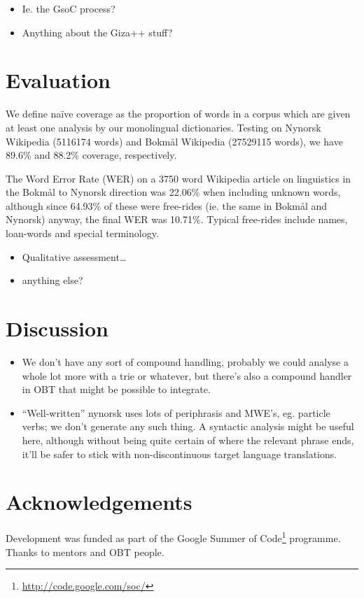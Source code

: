 \documentclass[11pt]{article}
\begin{document}
\begin{itemize}
\item Ie. the GsoC process?
\item Anything about the Giza++ stuff?
\end{itemize}
\section{Evaluation}
\label{sec-4}

We define naïve coverage as the proportion of words in a corpus which
are given at least one analysis by our monolingual
dictionaries. Testing on Nynorsk Wikipedia (5116174 words) and Bokmål
Wikipedia (27529115 words), we have 89.6\% and 88.2\% coverage,
respectively.

The Word Error Rate (WER) on a 3750 word Wikipedia article on
linguistics in the Bokmål to Nynorsk direction was 22.06\% when
including unknown words, although since 64.93\% of these were
free-rides (ie. the same in Bokmål and Nynorsk) anyway, the final WER
was 10.71\%. Typical free-rides include names, loan-words and special
terminology.

\begin{itemize}
\item Qualitative assessment\ldots{}
\item anything else?
\end{itemize}
\section{Discussion}
\label{sec-5}

\begin{itemize}
\item We don't have any sort of compound handling, probably we could
  analyse a whole lot more with a trie or whatever, but there's also a
  compound handler in OBT that might be possible to integrate.
\item ``Well-written'' nynorsk uses lots of periphrasis and MWE's, eg. particle
  verbs; we don't generate any such thing. A syntactic analysis might
  be useful here, although without being quite certain of where the
  relevant phrase ends, it'll be safer to stick with non-discontinuous
  target language translations.
\end{itemize}
\section{Acknowledgements}
\label{sec-6}

Development was funded as part of the Google Summer of Code\footnote{\href{http://code.google.com/soc/}{http://code.google.com/soc/} }
programme. Thanks to mentors and OBT people.



\end{document}
